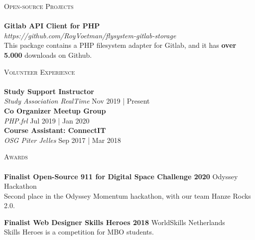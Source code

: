 \documentclass[a4paper]{article}
\newcommand{\lineunder} {
    \vspace*{-8pt} \\
    \hspace*{-18pt} \hrulefill \\
}
\newcommand{\header} [1] {
    {\hspace*{-18pt}\vspace*{6pt} \textsc{#1}}
    \vspace*{-6pt} \lineunder
}
\begin{document}
\vspace{5mm}

\header{Open-source Projects}
{\textbf{Gitlab API Client for PHP}} \\ \emph{https://github.com/RoyVoetman/flysystem-gitlab-storage}\\
This package contains a PHP filesystem adapter for Gitlab, and it has \textbf{over 5.000} downloads on Github.
\vspace*{2mm}

\vspace{5mm}

\header{Volunteer Experience}
\vspace{1mm}
\textbf{Study Support Instructor} \hfill\\
\textit{Study Association RealTime} \hfill Nov 2019 | Present\\
\vspace{2mm}
\textbf{Co Organizer Meetup Group} \hfill\\
\textit{PHP.frl} \hfill Jul 2019 | Jan 2020\\
\vspace{2mm}
\textbf{Course Assistant: ConnectIT} \hfill\\
\textit{OSG Piter Jelles} \hfill Sep 2017 | Mar 2018\\
\vspace{2mm}

\vspace{5mm}

\header{Awards}
\textbf{Finalist Open-Source 911 for Digital Space Challenge 2020} \hfill Odyssey Hackathon\\
Second place in the Odyssey Momentum hackathon, with our team Hanze Rocks 2.0.
\vspace*{2mm}

\textbf{Finalist Web Designer Skills Heroes 2018} \hfill WorldSkills Netherlands\\
Skills Heroes is a competition for MBO students.
\vspace*{2mm}

\ 
\end{document}
